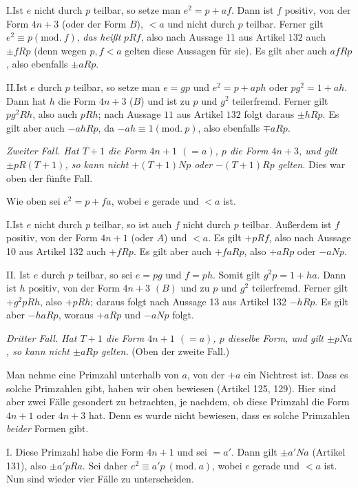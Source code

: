 I.\quad Ist $e$ nicht durch $p$ teilbar, so setze man $e^2=p+af$. Dann ist $f$ positiv, von der Form $4n+3$ (oder der Form $B$), $<a$ und nicht durch $p$ teilbar. Ferner gilt $e^2\equiv p(\mathrm{mod.}\ f)$, \emph{das heißt} $pRf$, also nach Aussage $11$ aus Artikel $132$ auch $\pm fRp$ (denn wegen $p,f<a$ gelten diese Aussagen für sie). Es gilt aber auch $afRp$, also ebenfalls $\pm aRp$.

II.\quad Ist $e$ durch $p$ teilbar, so setze man $e=gp$ und $e^2=p+aph$ oder $pg^2=1+ah$. Dann hat $h$ die Form $4n+3$ ($B$) und ist zu $p$ und $g^2$ teilerfremd. Ferner gilt $pg^2Rh$, also auch $pRh$; nach Aussage $11$ aus Artikel $132$ folgt daraus $\pm hRp$. Es gilt aber auch $-ahRp$, da $-ah\equiv1(\mathrm{mod.}\ p)$, also ebenfalls $\mp aRp$.

\emph{Zweiter Fall. Hat $T+1$ die Form $4n+1$ $(=a)$, $p$ die Form $4n+3$, und gilt $\pm pR(T+1)$, so kann nicht $+(T+1)Np$ oder $-(T+1)Rp$ gelten.} Dies war oben der fünfte Fall.

Wie oben sei $e^2=p+fa$, wobei $e$ gerade und $<a$ ist.

I.\quad Ist $e$ nicht durch $p$ teilbar, so ist auch $f$ nicht durch $p$ teilbar. Außerdem ist $f$ positiv, von der Form $4n+1$ (oder $A$) und $<a$. Es gilt $+pRf$, also nach Aussage 10 aus Artikel 132 auch $+fRp$. Es gilt aber auch $+faRp$, also $+aRp$ oder $-aNp$.

II. Ist $e$ durch $p$ teilbar, so sei $e=pg$ und $f=ph$. Somit gilt $g^2p=1+ha$. Dann ist $h$ positiv, von der Form $4n+3$ $(B)$ und zu $p$ und $g^2$ teilerfremd. Ferner gilt $+g^2pRh$, also $+pRh$; daraus folgt nach Aussage 13 aus Artikel 132 $-hRp$. Es gilt aber $-haRp$, woraus $+aRp$ und $-aNp$ folgt.

\textit{Dritter Fall. Hat $T+1$ die Form $4n+1$ $(=a)$, $p$ dieselbe Form, und gilt $\pm pNa$, so kann nicht $\pm aRp$ gelten.} (Oben der zweite Fall.)

Man nehme eine Primzahl unterhalb von $a$, von der $+a$ ein Nichtrest ist. Dass es solche Primzahlen gibt, haben wir oben bewiesen (Artikel 125, 129). Hier sind aber zwei Fälle gesondert zu betrachten, je nachdem, ob diese Primzahl die Form $4n+1$ oder $4n+3$ hat. Denn es wurde nicht bewiesen, dass es solche Primzahlen \textit{beider} Formen gibt.

I. Diese Primzahl habe die Form $4n+1$ und sei $=a'$. Dann gilt $\pm a'Na$ (Artikel 131), also $\pm a'pRa$. Sei daher $e^2\equiv a'p\ (\mathrm{mod.}\ a)$, wobei $e$ gerade und $<a$ ist. Nun sind wieder vier Fälle zu unterscheiden.

